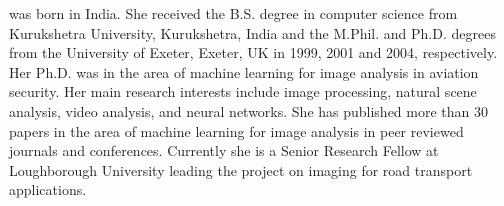 \documentclass{classe_cn}                 %
\begin{document}
 was born in India. She received the B.S. 
degree in computer science from Kurukshetra University, Kurukshetra, 
India and the M.Phil. and Ph.D. degrees from the University of Exeter, 
Exeter, UK in 1999, 2001 and 2004, respectively. Her Ph.D. was in the 
area of machine learning for image analysis in aviation security. Her 
main research interests include image processing, natural scene analysis,
video analysis, and neural networks. She has published more than 30 papers
in the area of machine learning for image analysis in peer reviewed 
journals and conferences. Currently she is a Senior Research Fellow at
Loughborough University leading the project on imaging for road transport
applications.   



\end{document}
